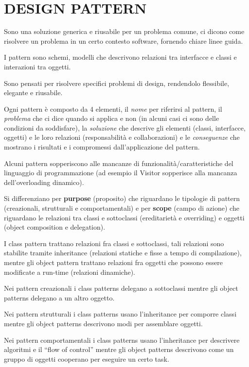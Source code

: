 \chapter{DESIGN PATTERN}

Sono una soluzione generica e riusabile per un problema comune, ci dicono come risolvere un problema in un certo contesto software, fornendo chiare linee guida.

I pattern sono schemi, modelli che descrivono relazioni tra interfacce e classi e interazioni tra oggetti. 

Sono pensati per risolvere specifici problemi di design, rendendolo flessibile, elegante e riusabile. 

Ogni pattern è composto da 4 elementi, il \textit{nome} per riferirsi al pattern, il \textit{problema} che ci dice quando si applica e non 
(in alcuni casi ci sono delle condizioni da soddisfare), la \textit{soluzione} che descrive gli elementi (classi, interfacce, oggetti) e le loro relazioni 
(responsabilità e collaborazioni) e le \textit{conseguenze} che mostrano i risultati e i compromessi dall’applicazione del pattern.

Alcuni pattern sopperiscono alle mancanze di funzionalità/caratteristiche del linguaggio di programmazione 
(ad esempio il Visitor sopperisce alla mancanza dell'overloading dinamico).

Si differenziano per \textbf{purpose} (proposito) che riguardano le tipologie di pattern (creazionali, strutturali e comportamentali) e per \textbf{scope} 
(campo di azione) che riguardano le relazioni tra classi e sottoclassi (ereditarietà e overriding) e oggetti (object composition e delegation).

I class pattern trattano relazioni fra classi e sottoclassi, tali relazioni sono stabilite tramite inheritance (relazioni statiche e fisse a tempo di compilazione),
mentre gli object pattern trattano relazioni fra oggetti che possono essere modificate a run-time (relazioni dinamiche).

Nei pattern creazionali i class patterns delegano a sottoclassi mentre gli object patterns delegano a un altro oggetto.

Nei pattern strutturali i class patterns usano l’inheritance per comporre classi mentre gli object patterns descrivono modi per assemblare oggetti.

Nei pattern comportamentali i class patterns usano l’inheritance per descrivere algoritmi e il “flow of control” mentre gli object patterns descrivono come un gruppo
di oggetti cooperano per eseguire un certo task.

